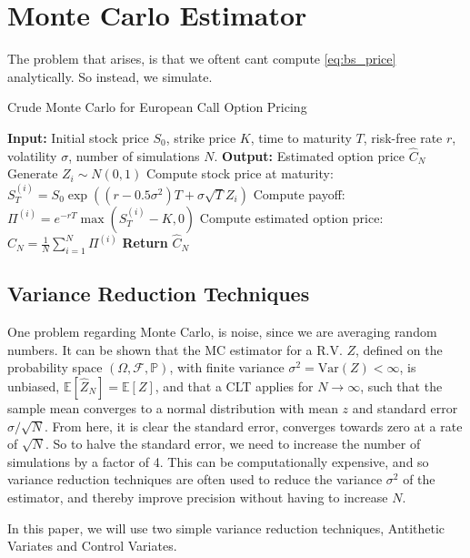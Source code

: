 \section{Monte Carlo Estimator}

The problem that arises, is that we oftent cant compute \eqref{eq:bs_price} analytically. So instead, we simulate.

\begin{algorithm}[H] \label{alg:mc_bs_european_call}
\caption{Crude Monte Carlo for European Call Option Pricing}
\begin{algorithmic}[1]
\State \textbf{Input:} Initial stock price $S_0$, strike price $K$, time to maturity $T$, risk-free rate $r$, volatility $\sigma$, number of simulations $N$.
\State \textbf{Output:} Estimated option price $\hat{C}_N$
    \State Generate $Z_i \sim N(0,1)$
    \State Compute stock price at maturity: $S_T^{(i)} = S_0 \exp((r-0.5\sigma^2)T+\sigma \sqrt{T}Z_i)$
    \State Compute payoff: $\Pi^{(i)} = e^{-rT} \max(S_T^{(i)} - K, 0)$
\EndFor
\State Compute estimated option price: $\hat{C}_N = \frac{1}{N} \sum_{i=1}^{N} \Pi^{(i)}$
\State \textbf{Return} $\hat{C}_N$
\end{algorithmic}
\end{algorithm}

\subsection{Variance Reduction Techniques}

One problem regarding Monte Carlo, is noise, since we are averaging random numbers. It can be shown that the MC estimator for a R.V. $Z$, defined on the probability space $(\Omega, \mathcal{F}, \mathbb{P})$, with finite variance $\sigma^2 = \text{Var}(Z) < \infty$, is unbiased, $\mathbb{E}[\hat{Z}_N] = \mathbb{E}[Z]$, and that a CLT applies for $N \to \infty$, such that the sample mean converges to a normal distribution with mean $z$ and standard error $\sigma/\sqrt{N}$. From here, it is clear the standard error, converges towards zero at a rate of $\sqrt{N}$. So to halve the standard error, we need to increase the number of simulations by a factor of 4. This can be computationally expensive, and so variance reduction techniques are often used to reduce the variance $\sigma^2$ of the estimator, and thereby improve precision without having to increase $N$. 

In this paper, we will use two simple variance reduction techniques, Antithetic Variates and Control Variates.

